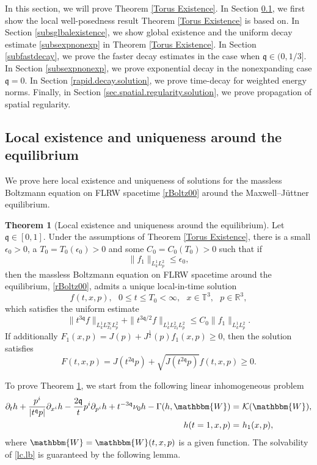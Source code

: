 \documentclass[reqno]{amsart}
\newcommand{\pv}{p}
\def\R{\mathbb R}
\newcommand{\qq}{\mathfrak{q}}
\newcommand{\tq}{t^{\qq}}
\newcommand{\tTq}{t^{3\qq}}
\newcommand{\compK}{\mathcal{K}}
\newcommand{\T}{\mathbb{T}}
\newcommand{\hh}{\mathbbm{W}}
\theoremstyle{definition}
\newtheorem{theorem}{Theorem}
\numberwithin{equation}{section}
\numberwithin{theorem}{section}
\begin{document}
In this section, we will prove Theorem \ref{Torus Existence}. In Section \ref{subsecexistuniq}, we first show the local well-posedness result Theorem \ref{Torus Existence} is based on. In Section \ref{subsglbalexistence}, we show global existence and the uniform decay estimate \eqref{subsexpnonexp} in Theorem \ref{Torus Existence}. In Section \ref{subfastdecay}, we prove the faster decay estimates in the case when \(\qq\in (0,1/3]\). In Section \ref{subsexpnonexp}, we prove exponential decay in the nonexpanding case \(\qq=0\). In Section \ref{rapid.decay.solution}, we prove time-decay for weighted energy norms. Finally, in Section \ref{sec.spatial.regularity.solution}, we prove propagation of spatial regularity.


\subsection{Local existence and uniqueness around the equilibrium}\label{subsecexistuniq}

We prove here local existence and uniqueness of solutions for the massless Boltzmann equation on FLRW spacetime \eqref{rBoltz00} around the Maxwell--J\"uttner equilibrium.


\begin{theorem}[Local existence and uniqueness around the equilibrium]\label{local.thm}
Let \(\qq\in [0,1]\). Under the assumptions of Theorem \ref{Torus Existence}, there is a small $\epsilon_0>0$, a $T_0=T_0(\epsilon_0)>0$ and some  $C_0=C_0(T_0)>0$ such that if 
\begin{equation}\label{initial.small.local}
\| f_{1}\|_{L_{k}^1L^2_{\pv}}\leq\epsilon_0,
\end{equation}
then the massless Boltzmann equation on FLRW spacetime around the equilibrium, \eqref{rBoltz00},
 admits a unique local-in-time solution
$$
f(t,x,\pv),~~ \ 0\leq t\leq T_0<\infty, ~~\ x\in  \T^3,~~\ \pv\in \R^3,
$$
which satisfies the  uniform estimate
\begin{equation}\label{loces}
\| \tTq f\|_{L^1_{{k}}L^\infty_{T_0}L^2_{\pv}}+\| t^{3\qq/2} f\|_{L^1_{{k}}L^2_{T_0}L^2_{\pv}}
\leq C_{0}
\|f_1\|_{L_{{k}}^1L^2_{\pv}}.
\end{equation}
If additionally 
$F_1(x,\pv)=J(\pv)+J^{\frac{1}{2}}(\pv)f_1(x,\pv)\geq0$,
then the solution satisfies
$$
F(t,{x},\pv)=J(t^{2\qq}p) +\sqrt{J(t^{2\qq}p) }f(t,{x},\pv)\geq0.
$$
\end{theorem}



To prove Theorem \ref{local.thm}, we start from the following linear inhomogeneous problem
\begin{equation}\label{lc.lb}
\begin{split}
        \partial_t h+ \frac{\pv^i}{|\tq \pv|}\partial_{x^i} h
    -\frac{2\qq }{t} p^i \partial_{p^i} h
    + t^{-3\qq} \nu_0 h
    -\Gamma(h,\hh)
= &~
\compK (\hh),
\\ 
h(t=1,x,\pv)
= &~
h_1(x,\pv),
\end{split}
\end{equation}
where $\hh=\hh(t,x,\pv)$ is a given function.  The solvability of \eqref{lc.lb} is guaranteed by the following lemma.
\end{document}
